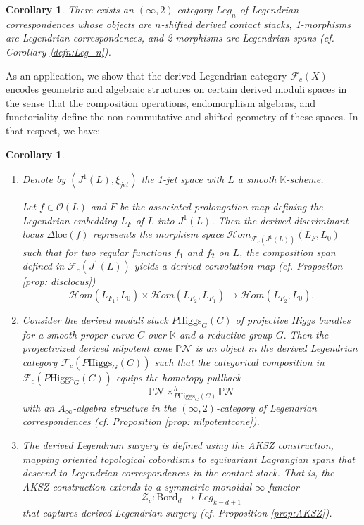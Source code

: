 \documentclass[reqno]{amsart}
\newcommand{\cO}{\mathcal{O}}
\newcommand{\K}{\mathbb{K}}
\newtheorem{corollary}[theorem]{Corollary}
\begin{document}
\begin{corollary}\label{cor:A}
    There exists an \emph{$(\infty,2)$-category $Leg_n$ of Legendrian correspondences} whose objects are $n$-shifted derived contact stacks, 1-morphisms are Legendrian correspondences, and 2-morphisms are Legendrian spans (cf. Corollary \ref{defn:Leg_n}).
\end{corollary}

As an application, we show that the derived Legendrian category $\mathcal{F}_{c}(X)$ encodes geometric and algebraic structures on certain derived moduli spaces in the sense that the composition operations, endomorphism algebras, and functoriality define the non-commutative and shifted geometry of these spaces. In that respect, we have:

\begin{corollary}\label{cor:B}
    \begin{enumerate}\itemsep=7pt
        \item Denote by $(J^1(L), \xi_{jet})$ the 1-jet space with $L$ a smooth $\K$-scheme. 
        
    \noindent Let $f \in \cO(L)$ and $F$ be the associated prolongation map defining the Legendrian embedding $L_F$ of $L$ into $J^1(L)$. Then the derived discriminant locus $\Delta\mathrm{loc}(f)$ represents the morphism space $\mathcal{H}om_{\mathcal{F}_{c}(J^1(L))}(L_F, L_0)$ such that for two regular functions $f_1$ and $f_2$ on $L$, the composition span defined in $\mathcal{F}_{c}(J^1(L))$ yields a derived convolution map (cf. Propositon \ref{prop: disclocus})
\[
    \mathcal{H}om(L_{F_1}, L_0) \times \mathcal{H}om(L_{F_2}, L_{F_1}) \to \mathcal{H}om(L_{F_2}, L_0).
\]
    \item Consider the derived moduli stack $P\mathrm{Higgs}_G(C)$ of projective Higgs bundles for a smooth proper curve $C$ over $\K$ and a reductive  group $G.$
    Then the projectivized derived nilpotent cone $\mathbb{P}\mathcal{N}$ is an object in the derived Legendrian category $\mathcal{F}_{c}(P\mathrm{Higgs}_G(C))$ such that the categorical composition in $\mathcal{F}_{c}(P\mathrm{Higgs}_G(C))$ equips the homotopy pullback \[ \mathbb{P}\mathcal{N} \times_{P\mathrm{Higgs}_G(C)}^h \mathbb{P}\mathcal{N} \] with an $A_\infty$-algebra structure in the $(\infty, 2)$-category of Legendrian correspondences (cf. Proposition \ref{prop: nilpotentcone}).
    \item The \emph{derived Legendrian surgery} is defined using the AKSZ construction, mapping oriented topological cobordisms to equivariant Lagrangian spans that descend to Legendrian correspondences in the contact stack. 
    That is, the AKSZ construction extends to a symmetric monoidal $\infty$-functor \[ \mathcal{Z}_{c} \colon \mathrm{Bord}_d \to Leg_{k-d+1} \] that captures derived Legendrian surgery (cf. Proposition \ref{prop:AKSZ}).
    \end{enumerate}
\end{corollary}
\end{document}
